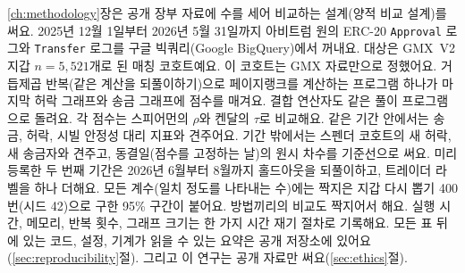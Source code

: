 
\ref{ch:methodology}장은 공개 장부 자료에 수를 세어 비교하는 설계(양적 비교 설계)를 써요. 2025년 12월 1일부터 2026년 5월 31일까지 아비트럼 원의 ERC-20 \texttt{Approval} 로그와 \texttt{Transfer} 로그를 구글 빅쿼리(Google BigQuery)에서 꺼내요. 대상은 GMX~V2 지갑 $n=5{,}521$개로 된 매칭 코호트예요. 이 코호트는 GMX 자료만으로 정했어요. 거듭제곱 반복(같은 계산을 되풀이하기)으로 페이지랭크를 계산하는 프로그램 하나가 마지막 허락 그래프와 송금 그래프에 점수를 매겨요. 결합 연산자도 같은 풀이 프로그램으로 돌려요. 각 점수는 스피어먼의 $\rho$와 켄달의 $\tau$로 비교해요. 같은 기간 안에서는 송금, 허락, 시빌 안정성 대리 지표와 견주어요. 기간 밖에서는 스펜더 코호트의 새 허락, 새 송금자와 견주고, 동결일(점수를 고정하는 날)의 원시 차수를 기준선으로 써요. 미리 등록한 두 번째 기간은 2026년 6월부터 8월까지 홀드아웃을 되풀이하고, 트레이더 라벨을 하나 더해요. 모든 계수(일치 정도를 나타내는 수)에는 짝지은 지갑 다시 뽑기 400번(시드 42)으로 구한 95\% 구간이 붙어요. 방법끼리의 비교도 짝지어서 해요. 실행 시간, 메모리, 반복 횟수, 그래프 크기는 한 가지 시간 재기 절차로 기록해요. 모든 표 뒤에 있는 코드, 설정, 기계가 읽을 수 있는 요약은 공개 저장소에 있어요(\ref{sec:reproducibility}절). 그리고 이 연구는 공개 자료만 써요(\ref{sec:ethics}절).



